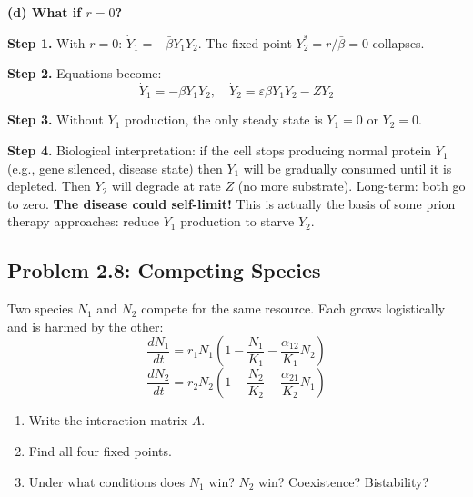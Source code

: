 \documentclass[10pt]{article}
\begin{document}
\begin{solution}
\medskip\textbf{(d) What if $r = 0$?}

\textbf{Step 1.} With $r = 0$: $\dot Y_1 = -\bar\beta Y_1 Y_2$. The fixed point $Y_2^* = r/\bar\beta = 0$ collapses.

\textbf{Step 2.} Equations become:
\[
\dot Y_1 = -\bar\beta Y_1 Y_2, \quad \dot Y_2 = \varepsilon\bar\beta Y_1 Y_2 - Z Y_2
\]

\textbf{Step 3.} Without $Y_1$ production, the only steady state is $Y_1 = 0$ or $Y_2 = 0$.

\textbf{Step 4.} Biological interpretation: if the cell stops producing normal protein $Y_1$ (e.g., gene silenced, disease state) then $Y_1$ will be gradually consumed until it is depleted. Then $Y_2$ will degrade at rate $Z$ (no more substrate). Long-term: both go to zero. \textbf{The disease could self-limit!} This is actually the basis of some prion therapy approaches: reduce $Y_1$ production to starve $Y_2$.
\end{solution}

\subsection{Problem 2.8: Competing Species}

\begin{problem}
Two species $N_1$ and $N_2$ compete for the same resource. Each grows logistically and is harmed by the other:
\[
\frac{dN_1}{dt} = r_1 N_1\left(1 - \frac{N_1}{K_1} - \frac{\alpha_{12}}{K_1}N_2\right)
\]
\[
\frac{dN_2}{dt} = r_2 N_2\left(1 - \frac{N_2}{K_2} - \frac{\alpha_{21}}{K_2}N_1\right)
\]
\begin{enumerate}[label=(\alph*)]
\item Write the interaction matrix $A$.
\item Find all four fixed points.
\item Under what conditions does $N_1$ win? $N_2$ win? Coexistence? Bistability?
\end{enumerate}
\end{problem}
\end{document}
